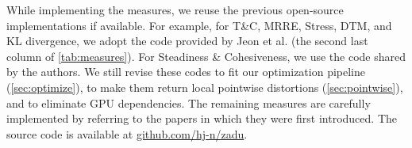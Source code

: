 While implementing the measures, we reuse the previous open-source implementations if available. 
For example, for T\&C, MRRE, Stress, DTM, and KL divergence, we adopt the code provided by Jeon et al. \cite{jeon22vis} (the second last column of \autoref{tab:measures}). For Steadiness \& Cohesiveness, we use the code shared by the authors. We still revise these codes to fit our optimization pipeline (\autoref{sec:optimize}), to make them return local pointwise distortions (\autoref{sec:pointwise}), and to eliminate GPU dependencies. The remaining measures are carefully implemented by referring to the papers in which they were first introduced. The source code is available at \href{https://github.com/hj-n/zadu}{github.com/hj-n/zadu}.











